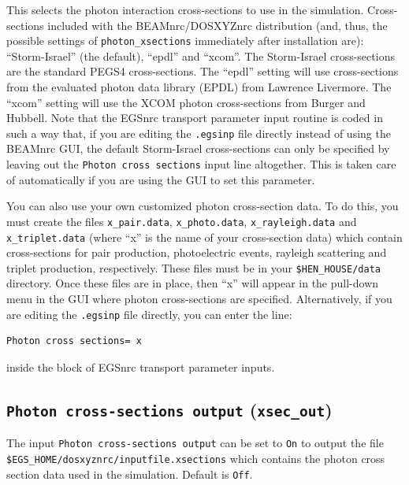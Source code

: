 \documentclass[12pt,twoside]{article}      %
\begin{document}
This selects the photon interaction cross-sections to use in
the simulation.  Cross-sections included with the BEAMnrc/DOSXYZnrc
distribution (and, thus, the possible settings of
{\tt photon\_xsections} immediately after installation are):
``Storm-Israel'' (the default), ``epdl'' and ``xcom''.
The Storm-Israel cross-sections are the standard PEGS4 cross-sections.
The ``epdl'' setting will use cross-sections from
the evaluated photon data library (EPDL) from Lawrence Livermore\cite{Cu90}.
The ``xcom'' setting will use the XCOM
photon cross-sections from Burger and Hubbell\cite{BH87}.  Note that
the EGSnrc transport parameter input routine is coded in such a way that,
if you are editing the {\tt .egsinp} file directly instead of using
the BEAMnrc GUI, the default Storm-Israel cross-sections can only be
specified by leaving out the {\tt Photon cross sections} input line
altogether.  This is taken care of automatically if you are using the
GUI to set this parameter.

You can also use your own customized photon cross-section data.  To do this,
you must create the files {\tt x\_pair.data}, {\tt x\_photo.data}, {\tt x\_rayleigh.data} and
{\tt x\_triplet.data} (where ``x'' is the name of your cross-section data)
which contain cross-sections for  pair production, photoelectric events, rayleigh scattering and triplet production, respectively.  These files must be in
your {\tt \$HEN\_HOUSE/data} directory.  Once these files are in place, then
``x'' will appear in the pull-down menu in the GUI where photon
cross-sections are specified.  Alternatively, if you are editing the
{\tt .egsinp} file directly, you can enter the line:
\begin{verbatim}
Photon cross sections= x
\end{verbatim}
inside the block of EGSnrc transport parameter inputs.


\subsection{{\tt Photon cross-sections output} ({\tt xsec\_out})}

The input {\tt Photon cross-sections output} can be set to {\tt On} to
output the file\\
 {\tt \$EGS\_HOME/dosxyznrc/inputfile.xsections} which
contains the photon cross section data used in the simulation.  Default
is {\tt Off}.
\end{document}
